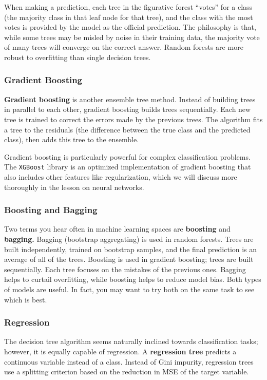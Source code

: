When making a prediction, each tree in the figurative forest ``votes'' for a class (the majority class in that leaf node for that tree), and the class with the most votes is provided by the model as the official prediction. The philosophy is that, while some trees may be misled by noise in their training data, the majority vote of many trees will converge on the correct answer. Random forests are more robust to overfitting than single decision trees. 

\subsubsection*{Gradient Boosting}
\textbf{Gradient boosting} is another ensemble tree method. Instead of building trees in parallel to each other, gradient boosting builds trees sequentially. Each new tree is trained to correct the errors made by the previous trees. The algorithm fits a tree to the residuals (the difference between the true class and the predicted class), then adds this tree to the ensemble.

Gradient boosting is particularly powerful for complex classification problems. The \verb|XGBoost| library is an optimized implementation of gradient boosting that also includes other features like regularization, which we will discuss more thoroughly in the lesson on neural networks.

\subsubsection*{Boosting and Bagging}
Two terms you hear often in machine learning spaces are \textbf{boosting} and \textbf{bagging.} Bagging (bootstrap aggregating) is used in random forests. Trees are built independently, trained on bootstrap samples, and the final prediction is an average of all of the trees. Boosting is used in gradient boosting; trees are built sequentially. Each tree focuses on the mistakes of the previous ones. Bagging helps to curtail overfitting, while boosting helps to reduce model bias. Both types of models are useful. In fact, you may want to try both on the same task to see which is best.

\subsubsection*{Regression}
The decision tree algorithm seems naturally inclined towards classification tasks; however, it is equally capable of regression. A \textbf{regression tree} predicts a continuous variable instead of a class. Instead of Gini impurity, regression trees use a splitting criterion based on the reduction in MSE of the target variable.

